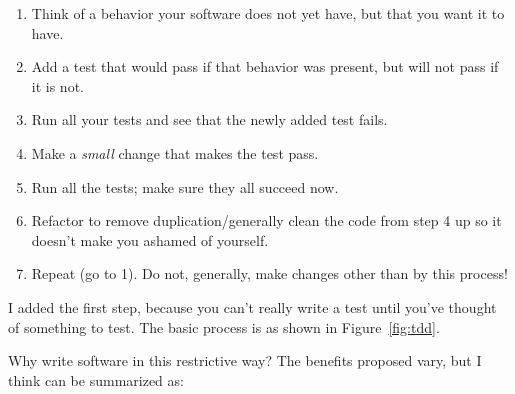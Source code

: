 \documentclass[sigplan,screen]{acmart}
\begin{document}
\begin{enumerate}
  \item Think of a behavior your software does not yet have,
    but that you want it to have.
    \item Add a test that would pass if that behavior was present, but
      will not pass if it is not.
    \item Run all your tests and see that the newly added test fails.
    \item Make a \emph{small} change that makes the test pass.
    \item Run all the tests; make sure they all succeed now.
      \item Refactor to remove duplication/generally clean the code
        from step 4 up so it doesn't make you ashamed of yourself.
        \item Repeat (go to 1).  Do not, generally, make changes other than by
          this process!
      \end{enumerate}

I added the first step, because you can't really write a test until
you've thought of something to test.  The basic process is as shown in Figure~\ref{fig:tdd}.


Why write software in this restrictive way?  The benefits proposed
vary, but I think can be summarized as:
\end{document}
